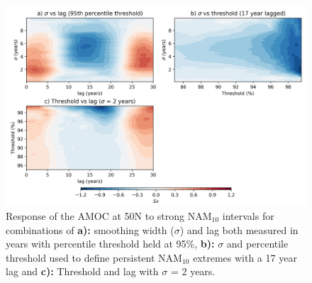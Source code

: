 \begin{figure}[h!]
\begin{center}
\noindent\includegraphics[width =\linewidth]{Figures/Figures-surface/sensitivity_contours_strong.png} 
\caption{Response of the AMOC at 50N to strong NAM$_{10}$ intervals for combinations of \textbf{a):} smoothing width ($\sigma$) and lag both measured in years with percentile threshold held at 95\%, \textbf{b):} $\sigma$ and percentile threshold used to define persistent NAM$_{10}$ extremes with a 17 year lag and \textbf{c):} Threshold and lag with $\sigma$ = 2 years.}
\label{sensitivity}
\end{center}
\end{figure}

